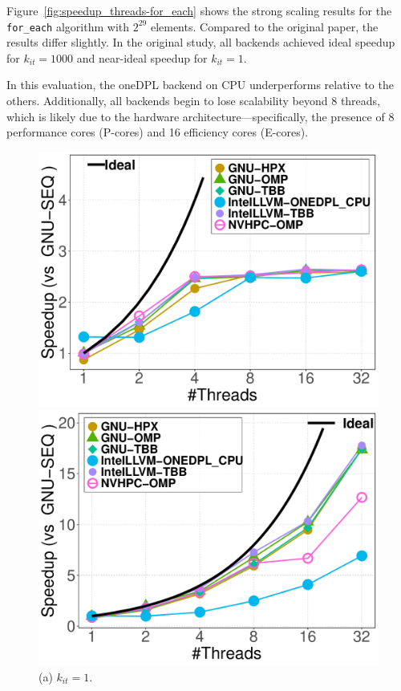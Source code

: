 \documentclass[sigconf]{acmart}
\begin{document}
Figure~\ref{fig:speedup_threads-for_each} shows the strong scaling results for
the \texttt{for\_each} algorithm with $2^{29}$ elements. Compared to the
original paper, the results differ slightly. In the original study, all
backends achieved ideal speedup for $k_{it} = 1000$ and near-ideal speedup for
$k_{it} = 1$.

In this evaluation, the oneDPL backend on CPU underperforms relative to the
others. Additionally, all backends begin to lose scalability beyond 8 threads,
which is likely due to the hardware architecture—specifically, the presence of
8 performance cores (P-cores) and 16 efficiency cores (E-cores).

\begin{figure}[H]
      \centering
      \begin{minipage}[t]{0.48\linewidth}
            \centering
            \includegraphics[width=\linewidth]{figures/speedup_threads-for_each-k1}
            \caption*{(a) $k_{it} = 1$.}
      \end{minipage}
      \hfill
      \begin{minipage}[t]{0.48\linewidth}
            \centering
            \includegraphics[width=\linewidth]{figures/speedup_threads-for_each-k1000}

\end{minipage}
\end{figure}
\end{document}
